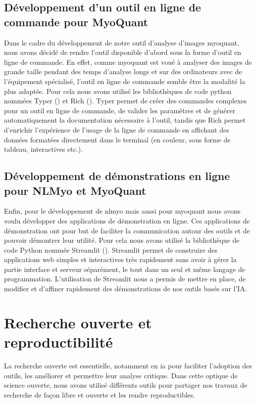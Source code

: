 \subsection{Développement d'un outil en ligne de commande pour MyoQuant}
Dans le cadre du développement de notre outil d'analyse d'images \gls{myoquant}, nous avons décidé de rendre l'outil disponible d'abord sous la forme d'outil en ligne de commande. En effet, comme \gls{myoquant} est voué à analyser des images de grande taille pendant des temps d'analyse longs et sur des ordinateurs avec de l'équipement spécialisé, l'outil en ligne de commande semble être la modalité la plus adaptée. Pour cela nous avons utilisé les bibliothèques de code python nommées Typer (\cite{ramirez_typer_2019}) et Rich (\cite{will_mcgugan_rich_2020}). Typer permet de créer des commandes complexes pour un outil en ligne de commande, de valider les paramètres et de générer automatiquement la documentation nécessaire à l'outil, tandis que Rich permet d'enrichir l'expérience de l'usage de la ligne de commande en affichant des données formatées directement dans le terminal (en couleur, sous forme de tableau, interactives etc.).

\subsection{Développement de démonstrations en ligne pour NLMyo et MyoQuant}
Enfin, pour le développement de \gls{nlmyo} mais aussi pour \gls{myoquant} nous avons voulu développer des applications de démonstration en ligne. Ces applications de démonstration ont pour but de faciliter la communication autour des outils et de pouvoir démontrer leur utilité. Pour cela nous avons utilisé la bibliothèque de code Python nommée Streamlit (\cite{adrien_treuille_streamlit_2018}). Streamlit permet de construire des applications web simples et interactives très rapidement sans avoir à gérer la partie interface et serveur séparément, le tout dans un seul et même langage de programmation. L'utilisation de Streamlit nous a permis de mettre en place, de modifier et d'affiner rapidement des démonstrations de nos outils basés sur l'IA.

\section{Recherche ouverte et reproductibilité}
La recherche ouverte est essentielle, notamment en \gls{ia} pour faciliter l'adoption des outils, les améliorer et permettre leur analyse critique. Dans cette optique de science ouverte, nous avons utilisé différents outils pour partager nos travaux de recherche de façon libre et ouverte et les rendre reproductibles.

